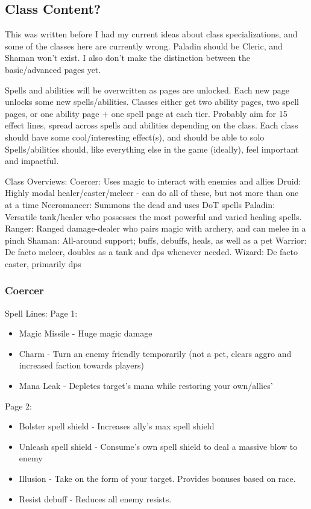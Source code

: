 \documentclass{article}
\begin{document}
\subsection{Class Content?}
This was written before I had my current ideas about class specializations, and some of the classes
here are currently wrong. Paladin should be Cleric, and Shaman won't exist. I also don't make
the distinction between the basic/advanced pages yet.

Spells and abilities will be overwritten as pages are unlocked.
Each new page unlocks some new spells/abilities.
Classes either get two ability pages, two spell pages, or one ability page + one spell page at each tier.
Probably aim for 15 effect lines, spread across spells and abilities depending on the class.
Each class should have some cool/interesting effect(s), and should be able to solo
Spells/abilities should, like everything else in the game (ideally), feel important and impactful.

Class Overviews:
Coercer: Uses magic to interact with enemies and allies
Druid: Highly modal healer/caster/meleer - can do all of these, but not more than one at a time
Necromancer: Summons the dead and uses DoT spells
Paladin: Versatile tank/healer who possesses the most powerful and varied healing spells.
Ranger: Ranged damage-dealer who pairs magic with archery, and can melee in a pinch
Shaman: All-around support; buffs, debuffs, heals, as well as a pet
Warrior: De facto meleer, doubles as a tank and dps whenever needed.
Wizard: De facto caster, primarily dps



\subsubsection{Coercer}
Spell Lines:
Page 1:
\begin{itemize}
    \item Magic Missile - Huge magic damage
    \item Charm - Turn an enemy friendly temporarily (not a pet, clears aggro and increased faction towards players)
    \item Mana Leak - Depletes target's mana while restoring your own/allies'
    
\end{itemize}

Page 2:
\begin{itemize}
    \item Bolster spell shield - Increases ally's max spell shield
    \item Unleash spell shield - Consume's own spell shield to deal a massive blow to enemy
    \item Illusion - Take on the form of your target. Provides bonuses based on race.
    \item Resist debuff - Reduces all enemy resists.
    
\end{itemize}
\end{document}
